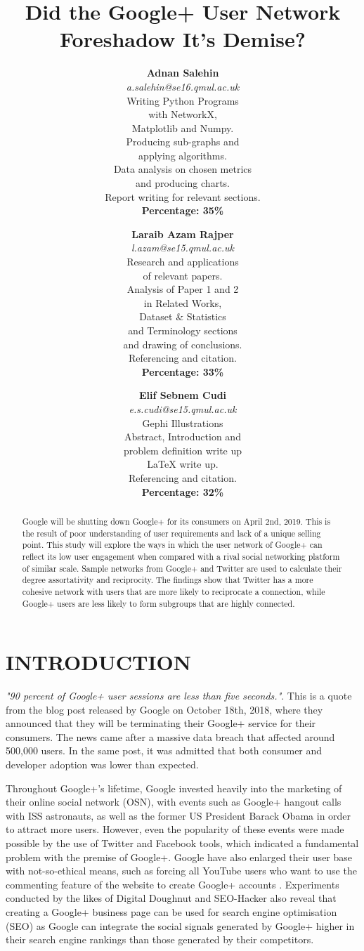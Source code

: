 \documentclass[a4paper, 10pt, conference]{ieeeconf}      %
\title{\LARGE \bf
Did the Google+ User Network Foreshadow It’s Demise?
}
\author{
\textbf{Adnan Salehin}\\
\textit{a.salehin@se16.qmul.ac.uk}\\
\small Writing Python Programs\\
\small with NetworkX,\\
\small Matplotlib and Numpy.\\
\small Producing sub-graphs and\\ 
\small applying algorithms.\\
\small Data analysis on chosen metrics\\ 
\small and producing charts.\\
\small Report writing for relevant sections.\\
\textbf{Percentage: 35{\%}} \and 
\textbf{Laraib Azam Rajper}\\
\textit{l.azam@se15.qmul.ac.uk}\\
\small Research and applications\\
\small of relevant papers.\\
\small Analysis of Paper 1 and 2\\ 
\small in Related Works,\\
\small Dataset {\&} Statistics\\
\small and Terminology sections\\
\small and drawing of conclusions.\\
\small Referencing and citation.\\
\textbf{Percentage: 33{\%}} \and 
\textbf{Elif Sebnem Cudi}\\ 
\textit{e.s.cudi@se15.qmul.ac.uk}\\
\small Gephi Illustrations\\
\small Abstract, Introduction and\\
\small problem definition write up\\
\small LaTeX write up.\\
\small Referencing and citation.\\
\textbf{Percentage: 32{\%}}}
\begin{document}
\maketitle            
\thispagestyle{plain}
\pagestyle{plain}

\begin{abstract}

Google will be shutting down Google+ for its consumers on April 2nd, 2019. This is the result of poor understanding of user requirements and lack of a unique selling point. This study will explore the ways in which the user network of Google+ can reflect its low user engagement when compared with a rival social networking platform of similar scale. Sample networks from Google+ and Twitter are used to calculate their degree assortativity and reciprocity. The findings show that Twitter has a more cohesive network with users that are more likely to reciprocate a connection, while Google+ users are less likely to form subgroups that are highly connected.

\end{abstract}

\section{INTRODUCTION}

\textit{"90 percent of Google+ user sessions are less than five seconds."}\cite{c1}. This is a quote from the blog post released by Google on October 18th, 2018, where they announced that they will be terminating their Google+ service for their consumers. The news came after a massive data breach that affected around 500,000 users. In the same post, it was admitted that both consumer and developer adoption was lower than expected.

Throughout Google+'s lifetime, Google invested heavily into the marketing of their online social network (OSN), with events such as Google+ hangout calls with ISS astronauts, as well as the former US President Barack Obama \cite{c2} in order to attract more users. However, even the popularity of these events were made possible by the use of Twitter and Facebook tools, which indicated a fundamental problem with the premise of Google+. Google have also enlarged their user base with not-so-ethical means, such as forcing all YouTube users who want to use 
the commenting feature of the website to create Google+ accounts \cite{c3}. Experiments conducted by the likes of Digital Doughnut \cite{c4} and SEO-Hacker \cite{c5} also reveal that creating a Google+ business page can be used for search engine optimisation (SEO) as Google can integrate the social signals generated by Google+ higher in their search engine rankings than those generated by their competitors.
\end{document}
